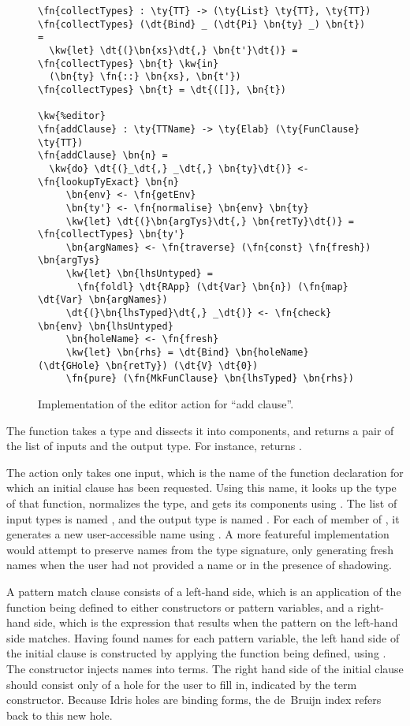 \begin{figure}[ht]
\begin{Verbatim}
\fn{collectTypes} : \ty{TT} -> (\ty{List} \ty{TT}, \ty{TT})
\fn{collectTypes} (\dt{Bind} _ (\dt{Pi} \bn{ty} _) \bn{t}) =
  \kw{let} \dt{(}\bn{xs}\dt{,} \bn{t'}\dt{)} = \fn{collectTypes} \bn{t} \kw{in}
  (\bn{ty} \fn{::} \bn{xs}, \bn{t'})
\fn{collectTypes} \bn{t} = \dt{([]}, \bn{t})

\kw{%editor}
\fn{addClause} : \ty{TTName} -> \ty{Elab} (\ty{FunClause} \ty{TT})
\fn{addClause} \bn{n} =
  \kw{do} \dt{(}_\dt{,} _\dt{,} \bn{ty}\dt{)} <- \fn{lookupTyExact} \bn{n}
     \bn{env} <- \fn{getEnv}
     \bn{ty'} <- \fn{normalise} \bn{env} \bn{ty}
     \kw{let} \dt{(}\bn{argTys}\dt{,} \bn{retTy}\dt{)} = \fn{collectTypes} \bn{ty'}
     \bn{argNames} <- \fn{traverse} (\fn{const} \fn{fresh}) \bn{argTys}
     \kw{let} \bn{lhsUntyped} =
       \fn{foldl} \dt{RApp} (\dt{Var} \bn{n}) (\fn{map} \dt{Var} \bn{argNames})
     \dt{(}\bn{lhsTyped}\dt{,} _\dt{)} <- \fn{check} \bn{env} \bn{lhsUntyped}
     \bn{holeName} <- \fn{fresh}
     \kw{let} \bn{rhs} = \dt{Bind} \bn{holeName} (\dt{GHole} \bn{retTy}) (\dt{V} \dt{0})
     \fn{pure} (\fn{MkFunClause} \bn{lhsTyped} \bn{rhs})
\end{Verbatim}
\caption{Implementation of the editor action for ``add clause''.}
\label{code:addClause}
\end{figure}

The  function takes a type and dissects it into components, and returns
a pair of the list of inputs and the output type. For instance,
returns .

The  action only takes one input, which is the name of
the function declaration for which an initial clause has been
requested.  Using this name, it looks up the type of that function,
normalizes the type, and gets its components using .
The list of input types is named , and the output type is
named . For each of member of , it generates a
new user-accessible name using . A more featureful
implementation would attempt to preserve names from the type
signature, only generating fresh names when the user had not provided
a name or in the presence of shadowing.

A pattern match clause consists of a left-hand side, which is an
application of the function being defined to either constructors or
pattern variables, and a right-hand side, which is the expression that
results when the pattern on the left-hand side matches.  Having found
names for each pattern variable, the left hand side of the initial
clause is constructed by applying the function being defined, using
.  The  constructor injects names into terms.  The
right hand side of the initial clause should consist only of a hole
for the user to fill in, indicated by the  term constructor.
Because Idris holes are binding forms, the de~Bruijn index 
refers back to this new hole.


